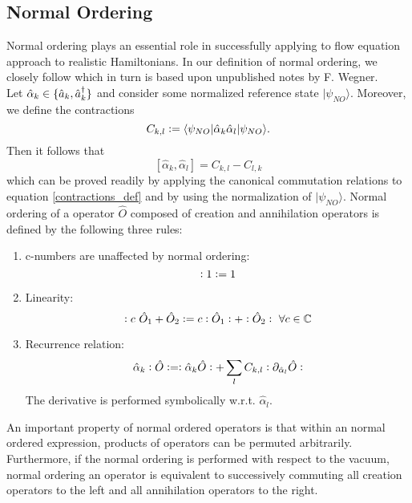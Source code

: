 \subsection{Normal Ordering}
Normal ordering plays an essential role in successfully applying to flow equation approach to realistic Hamiltonians. In our definition of normal ordering, we closely follow \cite[pp. 62-63]{kehrein2006flow} which in turn is based upon unpublished notes by F. Wegner.\\
Let $\hat\alpha_k\in\{\hat a_k,\hat a^\dagger_k\}$ and consider some normalized reference state $|\psi_{NO}\rangle$. Moreover, we define the contractions 
\begin{equation}\label{contractions_def}
C_{k,l}\vcentcolon= \langle \psi_{NO}|\hat\alpha_k\hat\alpha_l|\psi_{NO}\rangle.
\end{equation}
Then it follows that
\begin{equation}
\left[\hat\alpha_k,\hat\alpha_l\right] = C_{k,l}-C_{l,k}
\end{equation}
which can be proved readily by applying the canonical commutation relations to equation \ref{contractions_def} and by using the normalization of $|\psi_{NO}\rangle$.
Normal ordering of a operator $\hat O$ composed of creation and annihilation operators is defined by the following three rules:
\begin{enumerate}
\item c-numbers are unaffected by normal ordering:
\begin{equation}
\vcentcolon 1\vcentcolon = 1
\end{equation}
\item Linearity:
\begin{equation}
\vcentcolon c\ \hat O_1+\hat O_2\vcentcolon = c \vcentcolon \hat O_1\vcentcolon+\vcentcolon \hat O_2\vcentcolon\ \forall c\in\mathbb{C}
\end{equation}
\item Recurrence relation:
\begin{equation}\label{recurrence relation}
\hat\alpha_k\vcentcolon\hat O\vcentcolon=\vcentcolon\hat\alpha_k\hat O\vcentcolon + \sum\limits_l C_{k,l}\vcentcolon{\partial_{\hat\alpha_l}\hat O}\vcentcolon 
\end{equation}
The derivative is performed symbolically w.r.t. $\hat\alpha_l$.
\end{enumerate}
An important property of normal ordered operators is that within an normal ordered expression, products of operators can be permuted arbitrarily.\\
Furthermore, if the normal ordering is performed with respect to the vacuum, normal ordering an operator is equivalent to successively commuting all creation operators to the left and all annihilation operators to the right. 
